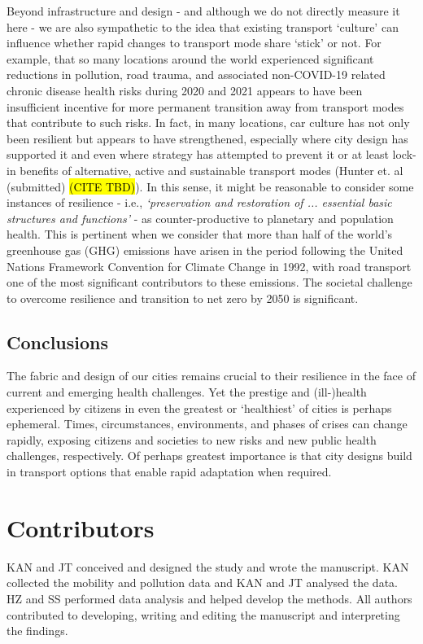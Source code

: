 \documentclass[preprint,10pt]{elsarticle} %
\begin{document}
Beyond infrastructure and design - and although we do not directly measure it here - we are also sympathetic to the idea that existing transport `culture' \cite{PATERSON_2000} can influence whether rapid changes to transport mode share `stick' or not. For example, that so many locations around the world experienced significant reductions in pollution, road trauma, and associated non-COVID-19 related chronic disease health risks during 2020 and 2021 appears to have been insufficient incentive for more permanent transition away from transport modes that contribute to such risks. In fact, in many locations, car culture has not only been resilient but appears to have strengthened, especially where city design has supported it and even where strategy has attempted to prevent it or at least lock-in benefits of alternative, active and sustainable transport modes (Hunter et. al (submitted) \hl{(CITE TBD)}). In this sense, it might be reasonable to consider some instances of resilience - i.e., \textit{`preservation and restoration of ... essential basic structures and functions'} - as counter-productive to planetary and population health. This is pertinent when we consider that more than half of the world's greenhouse gas (GHG) emissions have arisen in the period following the United Nations Framework Convention for Climate Change in 1992\cite{bashmakov2022climate}, with road transport one of the most significant contributors to these emissions. The societal challenge to overcome resilience and transition to net zero by 2050\cite{lynskey2020moving} is significant.

\subsection*{Conclusions}

The fabric and design of our cities remains crucial to their resilience in the face of current and emerging health challenges. Yet the prestige and (ill-)health experienced by citizens in even the greatest or `healthiest' of cities is perhaps ephemeral. Times, circumstances, environments, and phases of crises can change rapidly, exposing citizens and societies to new risks and new public health challenges, respectively. Of perhaps greatest importance is that city designs build in transport options that enable rapid adaptation when required.



\section*{Contributors}\label{sec:credit}
KAN and JT conceived and designed the study and wrote the manuscript. KAN collected the mobility and pollution data and KAN and JT analysed the data. HZ and SS performed data analysis and helped develop the methods. All authors contributed to developing, writing and editing the manuscript and interpreting the findings.
\end{document}
